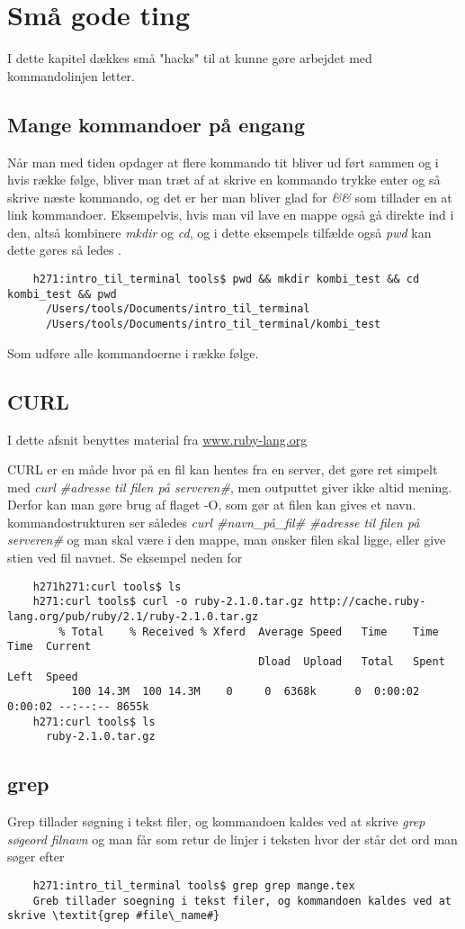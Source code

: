 \chapter{Små gode ting}
I dette kapitel dækkes små "hacks" til at kunne gøre arbejdet med kommandolinjen letter.
\section{Mange kommandoer på engang}
Når man med tiden opdager at flere kommando tit bliver ud ført sammen og i hvis række følge, bliver man træt af at skrive en kommando trykke enter og så skrive næste kommando, og det er her man bliver glad for \textit{\&\&} som tillader en at link kommandoer.
Eksempelvis, hvis man vil lave en mappe også gå direkte ind i den, altså kombinere \textit{mkdir} og \textit{cd}, og i dette eksempels tilfælde også \textit{pwd} kan dette gøres så ledes .
\begin{lstlisting}
	h271:intro_til_terminal tools$ pwd && mkdir kombi_test && cd kombi_test && pwd
	  /Users/tools/Documents/intro_til_terminal
	  /Users/tools/Documents/intro_til_terminal/kombi_test 
\end{lstlisting}
Som udføre alle kommandoerne i række følge. 

\section{CURL}
I dette afsnit benyttes material fra \href{http:www.ruby-lang.org}{www.ruby-lang.org} \par
CURL er en måde hvor på en fil kan hentes fra en server, det gøre ret simpelt med \textit{curl \#adresse til filen på serveren\#}, men outputtet giver ikke altid mening. Derfor kan man gøre brug af flaget -O, som gør at filen kan gives et navn. kommandostrukturen ser således \textit{curl \#navn\_på\_fil\# \#adresse til filen på serveren\#} og man skal være i den mappe, man ønsker filen skal ligge, eller give stien ved fil navnet. Se eksempel neden for 

\begin{lstlisting}
	h271h271:curl tools$ ls
	h271:curl tools$ curl -o ruby-2.1.0.tar.gz http://cache.ruby-lang.org/pub/ruby/2.1/ruby-2.1.0.tar.gz
	    % Total    % Received % Xferd  Average Speed   Time    Time     Time  Current
	                                   Dload  Upload   Total   Spent    Left  Speed
          100 14.3M  100 14.3M    0     0  6368k      0  0:00:02  0:00:02 --:--:-- 8655k
	h271:curl tools$ ls
	  ruby-2.1.0.tar.gz
\end{lstlisting}
\section{grep}
Grep tillader søgning i tekst filer, og kommandoen kaldes ved at skrive 
\textit{grep søgeord filnavn} og man får som retur de linjer i teksten hvor der står det ord man søger efter
\begin{lstlisting}
	h271:intro_til_terminal tools$ grep grep mange.tex
	Greb tillader soegning i tekst filer, og kommandoen kaldes ved at skrive \textit{grep #file\_name#}
\end{lstlisting}
